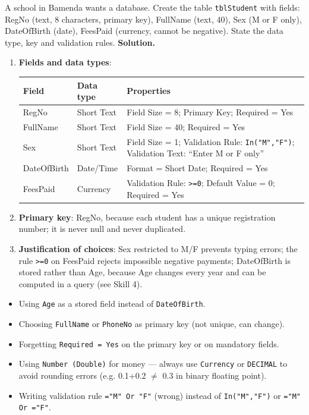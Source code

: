 \documentclass[11pt]{article}
\begin{document}
\begin{exoresolu}
A school in Bamenda wants a database. Create the table \texttt{tblStudent} with fields: RegNo (text, 8 characters, primary key), FullName (text, 40), Sex (M or F only), DateOfBirth (date), FeesPaid (currency, cannot be negative). State the data type, key and validation rules.
\tcblower
\textbf{Solution.}
\begin{enumerate}
\item \textbf{Fields and data types}:
\begin{center}
\begin{tabularx}{\linewidth}{|l|l|X|}
\hline
\rowcolor{popblueL} \textbf{Field} & \textbf{Data type} & \textbf{Properties} \\
\hline
RegNo & Short Text & Field Size = 8; Primary Key; Required = Yes \\
\hline
FullName & Short Text & Field Size = 40; Required = Yes \\
\hline
Sex & Short Text & Field Size = 1; Validation Rule: \texttt{In("M","F")}; Validation Text: ``Enter M or F only'' \\
\hline
DateOfBirth & Date/Time & Format = Short Date; Required = Yes \\
\hline
FeesPaid & Currency & Validation Rule: \texttt{>=0}; Default Value = 0; Required = Yes \\
\hline
\end{tabularx}
\end{center}
\item \textbf{Primary key}: RegNo, because each student has a unique registration number; it is never null and never duplicated.
\item \textbf{Justification of choices}: Sex restricted to M/F prevents typing errors; the rule \texttt{>=0} on FeesPaid rejects impossible negative payments; DateOfBirth is stored rather than Age, because Age changes every year and can be computed in a query (see Skill 4).
\end{enumerate}
\end{exoresolu}

\begin{attention}
\begin{itemize}
\item Using \texttt{Age} as a stored field instead of \texttt{DateOfBirth}.
\item Choosing \texttt{FullName} or \texttt{PhoneNo} as primary key (not unique, can change).
\item Forgetting \texttt{Required = Yes} on the primary key or on mandatory fields.
\item Using \texttt{Number (Double)} for money --- always use \texttt{Currency} or \texttt{DECIMAL} to avoid rounding errors (e.g. 0.1+0.2 $\neq$ 0.3 in binary floating point).
\item Writing validation rule \texttt{="M" Or "F"} (wrong) instead of \texttt{In("M","F")} or \texttt{="M" Or ="F"}.
\end{itemize}
\end{attention}
\end{document}
